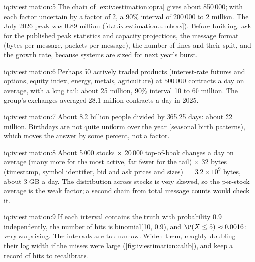 \begin{solution}{iq:iv:estimation:5}
The chain of \cref{ex:iv:estimation:opra} gives about 850\,000; with each factor uncertain by a factor of 2, a
90\% interval of 200\,000 to 2 million. The July 2026 peak was 0.89 million (\cref{dat:iv:estimation:anchors}).
Before building: ask for the published peak statistics and capacity projections, the message format (bytes per
message, packets per message), the number of lines and their split, and the growth rate, because systems are
sized for next year's burst.
\end{solution}

\begin{solution}{iq:iv:estimation:6}
Perhaps 50 actively traded products (interest-rate futures and options, equity index, energy, metals,
agriculture) at 500\,000 contracts a day on average, with a long tail: about 25 million, 90\% interval 10 to 60
million. The group's exchanges averaged 28.1 million contracts a day in 2025.
\end{solution}

\begin{solution}{iq:iv:estimation:7}
About 8.2 billion people divided by 365.25 days: about 22 million. Birthdays are not quite uniform over the year
(seasonal birth patterns), which moves the answer by some percent, not a factor.
\end{solution}

\begin{solution}{iq:iv:estimation:8}
About 5\,000 stocks $\times$ 20\,000 top-of-book changes a day on average (many more for the most active, far
fewer for the tail) $\times$ 32 bytes (timestamp, symbol identifier, bid and ask prices and sizes) $= 3.2
\times 10^9$ bytes, about 3 GB a day. The distribution across stocks is very skewed, so the per-stock average
is the weak factor; a second chain from total message counts would check it.
\end{solution}

\begin{solution}{iq:iv:estimation:9}
If each interval contains the truth with probability 0.9 independently, the number of hits is binomial(10,
0.9), and $\P(X \le 5) \approx 0.0016$: very surprising. The intervals are too narrow. Widen them, roughly
doubling their log width if the misses were large (\cref{fig:iv:estimation:calib}), and keep a record of hits
to recalibrate.
\end{solution}

